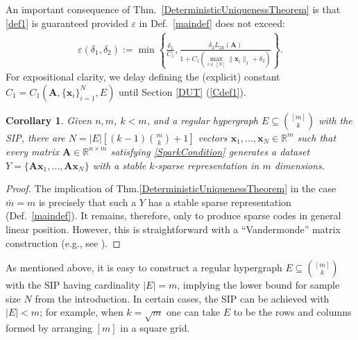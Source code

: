 \documentclass[9pt,twocolumn]{pnas-new}
\newtheorem{proposition}{Proposition}
\newtheorem{corollary}{Corollary}
\begin{document}
An important consequence of Thm.~\ref{DeterministicUniquenessTheorem} is that \eqref{def1} is guaranteed provided $\varepsilon$ in Def.~\ref{maindef} does not exceed: %
\begin{align}\label{epsdel}
\varepsilon(\delta_1, \delta_2) := \min \left\{ \frac{\delta_1}{ C_1 }, \frac{ \delta_2 L_{2k}(\mathbf{A})}{ 1 + C_1 \left( \max_{i \in [N]} \|\mathbf{x}_i\|_1  + \delta_2 \right) } \right\}.
\end{align}
For expositional clarity, we delay defining the (explicit) constant $C_1 = C_1(\mathbf{A}, \{\mathbf{x}_i\}_{i=1}^N, E)$ until Section \ref{DUT} (\eqref{Cdef1}).  %



\begin{corollary}\label{DeterministicUniquenessCorollary}
Given $n, m$, $k < m$, and a regular hypergraph $E \subseteq {[m] \choose k}$ with the SIP, there are $N =  |E| \left[ (k-1){m \choose k} + 1  \right]$ vectors \mbox{$\mathbf{x}_1, \ldots, \mathbf{x}_N \in \mathbb{R}^m$} such that every matrix $\mathbf{A} \in \mathbb{R}^{n \times m}$ satisfying \eqref{SparkCondition} generates a dataset $Y = \{\mathbf{A}\mathbf{x}_1, \ldots, \mathbf{A}\mathbf{x}_N\}$ with a stable $k$-sparse representation in $m$ dimensions.
\end{corollary}
\begin{proof}
The implication of Thm.\ref{DeterministicUniquenessTheorem} in the case $\bar{m} = m$ is precisely that such a $Y$ has a stable sparse representation (Def.~\ref{maindef}).  It remains, therefore, only to produce sparse codes in general linear position.  However, this is straightforward with a ``Vandermonde'' matrix construction (e.g., see \cite{Hillar15}).
\end{proof}

As mentioned above, it is easy to construct a regular hypergraph $E \subseteq {[m] \choose k}$ with the SIP having cardinality $|E| = m$, implying the lower bound for sample size $N$ from the introduction. In certain cases, the SIP can be achieved with $|E| < m$; for example, when $k = \sqrt{m}$ one can take $E$ to be the rows and columns formed by arranging $[m]$ in a square grid.  
\end{document}
